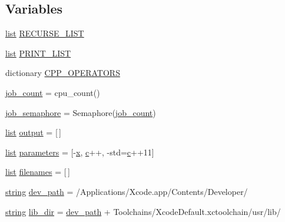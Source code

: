 \subsection*{Variables}
\begin{DoxyCompactItemize}
\item 
\mbox{\hyperlink{classlist}{list}} \mbox{\hyperlink{namespacemkdoc_a39fcd8cacdb85662261873832c8cdbc4}{R\+E\+C\+U\+R\+S\+E\+\_\+\+L\+I\+ST}}
\item 
\mbox{\hyperlink{classlist}{list}} \mbox{\hyperlink{namespacemkdoc_ad7a4a26a7761f2006a2d5b2008f8a3ed}{P\+R\+I\+N\+T\+\_\+\+L\+I\+ST}}
\item 
dictionary \mbox{\hyperlink{namespacemkdoc_ad4b3ba2731787584b72a4988e043a7f4}{C\+P\+P\+\_\+\+O\+P\+E\+R\+A\+T\+O\+RS}}
\item 
\mbox{\hyperlink{namespacemkdoc_a78cb707792ea1729ef7e8d3887275e66}{job\+\_\+count}} = cpu\+\_\+count()
\item 
\mbox{\hyperlink{namespacemkdoc_a2293819b2cd2fceaf9736ba54d68c05a}{job\+\_\+semaphore}} = Semaphore(\mbox{\hyperlink{namespacemkdoc_a78cb707792ea1729ef7e8d3887275e66}{job\+\_\+count}})
\item 
\mbox{\hyperlink{classlist}{list}} \mbox{\hyperlink{namespacemkdoc_a6299c53cb772acb4a1cb315a21268404}{output}} = \mbox{[}$\,$\mbox{]}
\item 
\mbox{\hyperlink{classlist}{list}} \mbox{\hyperlink{namespacemkdoc_a2cff62850018cb669b1d13bb8c335018}{parameters}} = \mbox{[}\textquotesingle{}-\/\mbox{\hyperlink{_s_d_l__opengl_8h_ad0e63d0edcdbd3d79554076bf309fd47}{x}}\textquotesingle{}, \textquotesingle{}\mbox{\hyperlink{_s_d_l__opengl__glext_8h_a1f2d7f8147412c43ba2303a56f97ee73}{c}}++\textquotesingle{}, \textquotesingle{}-\/std=\mbox{\hyperlink{_s_d_l__opengl__glext_8h_a1f2d7f8147412c43ba2303a56f97ee73}{c}}++11\textquotesingle{}\mbox{]}
\item 
\mbox{\hyperlink{classlist}{list}} \mbox{\hyperlink{namespacemkdoc_ad5cf7d23761d598592b4ff19c50f1808}{filenames}} = \mbox{[}$\,$\mbox{]}
\item 
\mbox{\hyperlink{asdl_8h_ae84541b4f3d8e1ea24ec0f466a8c568b}{string}} \mbox{\hyperlink{namespacemkdoc_afd27915357cd6df92f7e64673bd208b5}{dev\+\_\+path}} = \textquotesingle{}/Applications/Xcode.\+app/Contents/Developer/\textquotesingle{}
\item 
\mbox{\hyperlink{asdl_8h_ae84541b4f3d8e1ea24ec0f466a8c568b}{string}} \mbox{\hyperlink{namespacemkdoc_a79687e87b072bd21df37d124afa374ef}{lib\+\_\+dir}} = \mbox{\hyperlink{namespacemkdoc_afd27915357cd6df92f7e64673bd208b5}{dev\+\_\+path}} + \textquotesingle{}Toolchains/Xcode\+Default.\+xctoolchain/usr/lib/\textquotesingle{}

\end{DoxyCompactItemize}
